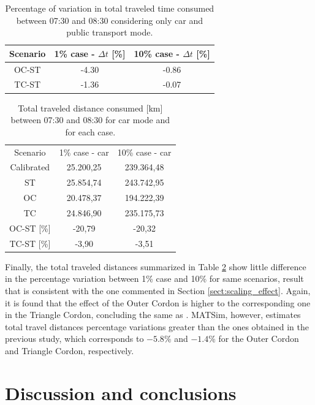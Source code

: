 \documentclass[Journal,letterpaper]{ascelike-new}
\begin{document}
\begin{table}
	\centering
	\caption{Percentage of variation in total traveled time consumed between 07:30 and 08:30 considering only car and public transport mode.}
	\label{table:travel_time_variation_car_pt}
	\begin{tabular}{ccc}
		\hline
		Scenario & 1\% case - $\Delta \mathit{t}$ [\%] & 10\% case - $\Delta \mathit{t}$ [\%] \\ 
		\hline
		OC-ST 	 & -4.30  & -0.86  \\
		TC-ST 	 & -1.36  & -0.07  \\ 
		\hline
	\end{tabular}
\end{table}

\begin{table}[h!]
	\centering
	\caption{Total traveled distance consumed [km] between 07:30 and 08:30 for car mode and for each case.}
	\label{table:travel_distance_variation}
	\begin{tabular}{c|cc}
		\cline{1-3}
		Scenario	& 1\% case - car  & 10\% case - car   \\ 
		\cline{1-3}
		Calibrated	& 25.200,25	& 239.364,48  \\
		ST			& 25.854,74	& 243.742,95  \\
		OC			& 20.478,37	& 194.222,39  \\
		TC			& 24.846,90	& 235.175,73  \\
		\hline
		OC-ST [\%] 	& -20,79 & -20,32 \\		
		TC-ST [\%] 	& -3,90  & -3,51  \\					
		\cline{1-3} 
	\end{tabular}
\end{table}

Finally, the total traveled distances summarized in Table \ref{table:travel_distance_variation} show little difference in the percentage variation between 1\% case and 10\% for same scenarios, result that is consistent with the one commented in Section \ref{sect:scaling_effect}. Again, it is found that the effect of the Outer Cordon is higher to the corresponding one in the Triangle Cordon, concluding the same as \cite{gleave2009tarificacion}. MATSim, however, estimates total travel distances percentage variations greater than the ones obtained in the previous study, which corresponds to $-5.8$\% and $-1.4$\% for the Outer Cordon and Triangle Cordon, respectively.

\section{Discussion and conclusions}
\end{document}
